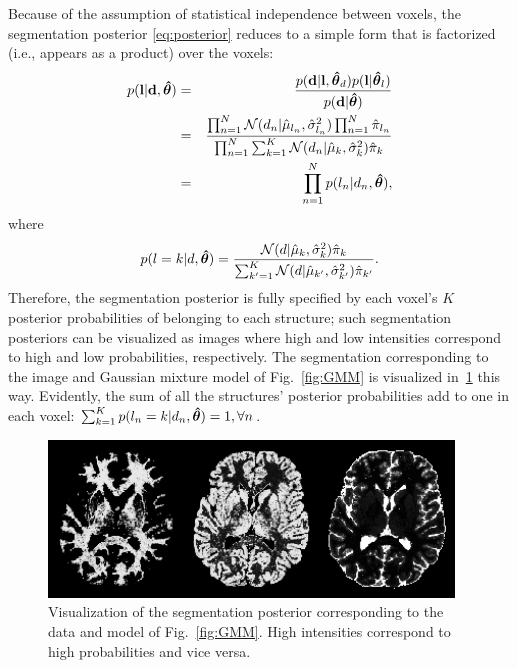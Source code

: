 \documentclass[10pt,twoside]{book}
\begin{document}
Because of the assumption of statistical independence between voxels, the segmentation posterior \eqref{eq:posterior} reduces to a simple form that is factorized (i.e., appears as a product) over the voxels:
\begin{eqnarray}
  p( \fat{l} | \fat{d}, \bldgr{\hat{\theta}}) & = & \frac{p( \fat{d} | \fat{l}, \bldgr{\hat{\theta}}_d ) p( \fat{l} | \bldgr{\hat{\theta}}_l )}%
                                                         {p( \fat{d} | \bldgr{\hat{\theta}} )} \nonumber\\
                                              & = & \frac{\prod_{n=1}^N \N( d_n | \hat{\mu}_{l_n}, \hat{\sigma}_{l_n}^2 ) \prod_{n=1}^N \hat{\pi}_{l_n}}%
                                                         {\prod_{n=1}^N \sum_{k=1}^K \N( d_n | \hat{\mu}_k, \hat{\sigma}_k^2 ) \hat{\pi}_k } \nonumber\\
                                              & = & \prod_{n=1}^N p( l_n | d_n, \bldgr{\hat{\theta}} ),
  \label{eq:GMMjointPosterior}
\end{eqnarray}
where 
\begin{equation}
  p( l=k | d, \bldgr{\hat{\theta}} ) = \frac{ \N( d | \hat{\mu}_k, \hat{\sigma}_k^2 ) \hat{\pi}_k }%
                                              { \sum_{k'=1}^K \N( d | \hat{\mu}_{k'}, \hat{\sigma}_{k'}^2 ) \hat{\pi}_{k'} }.
  \label{eq:GMMposterior}
\end{equation}
Therefore, the segmentation posterior is fully specified by each voxel's $K$ posterior probabilities of belonging to each structure; such segmentation posteriors can be visualized as images where high and low intensities correspond to high and low probabilities, respectively. The segmentation corresponding to the image and Gaussian mixture model of Fig.~\ref{fig:GMM} is visualized in~\ref{fig:GMMSegmentation} this way. 
Evidently, the sum of all the structures' posterior probabilities add to one in each voxel: $\sum_{k=1}^K p( l_n=k | d_n, {\mbox{\boldmath {${\hat{\theta}}$}}} ) = 1, \forall n$. 

\begin{figure}
  \centering
  \includegraphics[width=0.96\textwidth]{brainTissueClassification}
  \caption{Visualization of the segmentation posterior corresponding to the data and model of Fig.~\ref{fig:GMM}. High intensities correspond to high probabilities and vice versa.}
  \label{fig:GMMSegmentation}
\end{figure}
\end{document}
